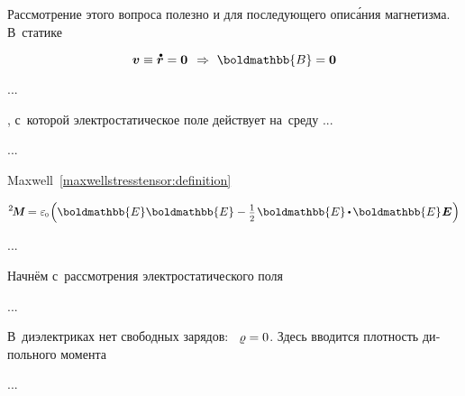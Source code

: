 \begin{otherlanguage}{russian}

Рассмотрение этого вопроса полезно и для последующего опис\'{а}ния магнетизма. В~статике

\nopagebreak\vspace{-0.2em}\begin{equation*}
\bm{v} \equiv \mathdotabove{\bm{r}} = \bm{0}
\hspace{.44em} \Rightarrow \hspace{.33em}
\boldmathbb{B} = \bm{0}
\end{equation*}

...

  , с~которой электростатическое поле действует на~среду ...

...

Maxwell~\eqref{maxwellstresstensor:definition} 

\nopagebreak\vspace{-0.2em}\begin{equation*}
\maxwellstress = \vacuumpermittivity \hspace{-0.2ex} \left( \boldmathbb{E} \boldmathbb{E} - \smalldisplaystyleonehalf \hspace{.2ex} \boldmathbb{E} \hspace{-0.1ex} \dotp \hspace{-0.16ex} \boldmathbb{E} \hspace{.1ex} \bm{E} \hspace{.1ex} \right)
\end{equation*}

...


\end{otherlanguage}



\begin{otherlanguage}{russian}

Начнём с~рассмотрения электростатического поля

...

В~диэлектриках нет свободных зарядов: ~${\varrho = 0}$. Здесь вводится плотность дипольного момента

...


\end{otherlanguage}

